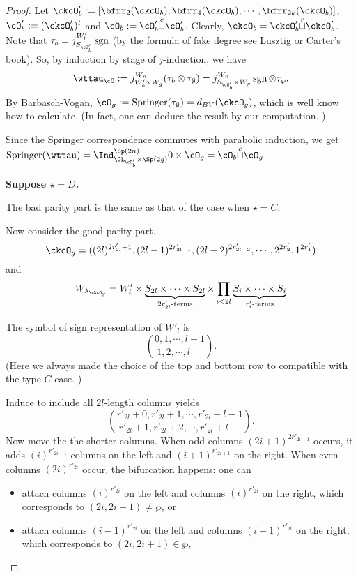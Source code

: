 \documentclass[12pt,a4paper]{amsart}
\newcommand{\sgn}{\operatorname{sgn}}
\numberwithin{equation}{section}
\theoremstyle{remark}
\def\lamckg{\lambda_{\ckcO_g}}
\def\cuprow{{\stackrel{r}{\sqcup}}}
\def\cupcol{{\stackrel{c}{\sqcup}}}
\def\Spr{\mathrm{Springer}}
\begin{document}
\begin{proof}
{      Let
      $\ckcO'_{b}: = [\bfrr_{2}(\ckcO_{b}), \bfrr_{4}(\ckcO_{b}),\cdots, \bfrr_{2k}(\ckcO_{b})]$,
      $\cO'_{b}:=(\ckcO'_{b})^{t}$ and $\cO_{b}:=\cO'_{b}\cupcol \cO'_{b}$.
      Clearly, $\ckcO_{b} = \ckcO'_{b}\cuprow \ckcO'_{b}$. Note that
      $\tau_{b} = j_{S_{\cO'_{b}}}^{W'_{b}} \sgn$ (by the formula of fake degree
      see Lusztig or Carter's book). So, by induction by stage of $j$-induction,
      we have
      \[
        \wttau_{\cO}:= j_{W'_{b}\times W_{g}}^{W_{n}} (\tau_{b}\otimes \tau_{\emptyset}) = j_{S_{\cO'_{b}}\times W_{g}}^{W_{n}} \sgn\otimes \tau_{\wp}.
      \]
      By Barbasch-Vogan, $\cO_{g}:=\Spr(\tau_{\emptyset}) = d_{BV}(\ckcO_{g})$,
      which is well know how to calculate. (In fact, one can deduce the result
      by our computation. )

      Since the Springer correspondence commutes with parabolic induction, we
      get
      $\Spr(\wttau) = \Ind_{\GL_{\cO'_{b}}\times \Sp(2g)}^{\Sp(2n)} 0\times \cO_{g} = \cO_{b}\cupcol \cO_{g}$.


      \medskip

      {\bf Suppose $\star=D$.}

      The bad parity part is the same as that of the case when $\star = C$.

      Now consider the good parity part.
      \[
        \ckcO_{g} = ((2l)^{2r'_{2l}+1}, (2l-1)^{2r'_{2l-1}}, (2l-2)^{2r'_{2l-2}}, \cdots, 2^{2r'_{2}}, 1^{2r'_{1}} )
      \]
      and
      \[
        W_{\lamckg} = W'_{l}\times \underbrace{S_{2l}\times \cdots \times S_{2l}}_{2r'_{2l}\text{-terms}} \times \prod_{i<2l} \underbrace{S_{i}\times \cdots\times S_{i}}_{r'_{i}\text{-terms}}
      \]

      The symbol of sign representation of $W'_{l}$ is
      \[
        \binom{0,1, \cdots, l-1}{1,2, \cdots, l\phantom{-1}}.
      \]
      (Here we always made the choice of the top and bottom row to compatible
      with the type $C$ case. )

      Induce to include all $2l$-length columns yields
      \[
        \binom{r'_{2l}+0,r'_{2l}+1, \cdots, r'_{2l}+l-1}{ r'_{2l}+1,r'_{2l}+2, \cdots, r'_{2l}+l\phantom{-1}}.
      \]
      Now move the the shorter columns. When odd columns $(2i+1)^{2r'_{2i+1}}$
      occurs, it adds $(i)^{r'_{2i+1}}$ columns on the left and
      $(i+1)^{r'_{2i+1}}$ on the right. When even columns $(2i)^{r'_{2i}}$
      occur, the bifurcation happens: one can
      \begin{itemize}
        \item attach columns $(i)^{r'_{2i}}$ on the left and columns
              $(i)^{r'_{2i}}$ on the right, which corresponds to
              $(2i,2i+1)\neq \wp$, or
        \item attach columns $(i-1)^{r'_{2i}}$ on the left and columns
              $(i+1)^{r'_{2i}}$ on the right, which corresponds to
              $(2i,2i+ 1)\in \wp$,
      \end{itemize}

}
\end{proof}
\end{document}

